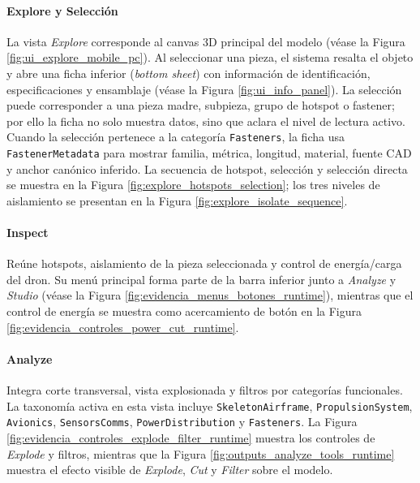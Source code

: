 \paragraph{Explore y Selección} La vista \textit{Explore} corresponde al canvas 3D principal del modelo (véase la Figura \ref{fig:ui_explore_mobile_pc}). Al seleccionar una pieza, el sistema resalta el objeto y abre una ficha inferior (\textit{bottom sheet}) con información de identificación, especificaciones y ensamblaje (véase la Figura \ref{fig:ui_info_panel}). La selección puede corresponder a una pieza madre, subpieza, grupo de hotspot o fastener; por ello la ficha no solo muestra datos, sino que aclara el nivel de lectura activo. Cuando la selección pertenece a la categoría \texttt{Fasteners}, la ficha usa \texttt{FastenerMetadata} para mostrar familia, métrica, longitud, material, fuente CAD y anchor canónico inferido. La secuencia de hotspot, selección y selección directa se muestra en la Figura \ref{fig:explore_hotspots_selection}; los tres niveles de aislamiento se presentan en la Figura \ref{fig:explore_isolate_sequence}.

\paragraph{Inspect} Reúne hotspots, aislamiento de la pieza seleccionada y control de energía/carga del dron. Su menú principal forma parte de la barra inferior junto a \textit{Analyze} y \textit{Studio} (véase la Figura \ref{fig:evidencia_menus_botones_runtime}), mientras que el control de energía se muestra como acercamiento de botón en la Figura \ref{fig:evidencia_controles_power_cut_runtime}.

\paragraph{Analyze} Integra corte transversal, vista explosionada y filtros por categorías funcionales. La taxonomía activa en esta vista incluye \texttt{SkeletonAirframe}, \texttt{PropulsionSystem}, \texttt{Avionics}, \texttt{SensorsComms}, \texttt{PowerDistribution} y \texttt{Fasteners}. La Figura \ref{fig:evidencia_controles_explode_filter_runtime} muestra los controles de \textit{Explode} y filtros, mientras que la Figura \ref{fig:outputs_analyze_tools_runtime} muestra el efecto visible de \textit{Explode}, \textit{Cut} y \textit{Filter} sobre el modelo.

